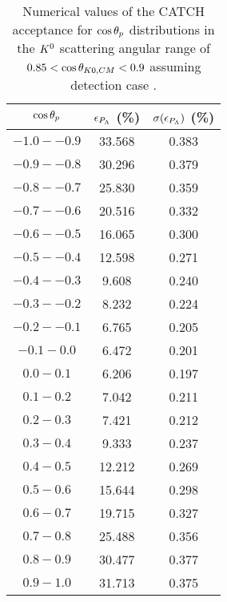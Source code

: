 \begin{table}[!h] 
  \begin{center}
  \caption{Numerical values of the CATCH acceptance for $\cos{\theta_p}$ distributions in the $K^{0}$ scattering angular range of \textbf{$0.85<\cos{\theta_{K0,CM}}<0.9$} assuming detection case .}
  \centering
  \begin{threeparttable}
    \begin{tabular}{ccc}
    $\cos{\theta_p}$ & $\epsilon_{P_{\Lambda}}$ (\%) & $\sigma(\epsilon_{P_{\Lambda}})$ (\%) \\
    \midrule\midrule
    $-1.0 - -0.9$ & 33.568 & 0.383 \\
    \midrule
    $-0.9 - -0.8$ & 30.296 & 0.379 \\
    \midrule
    $-0.8 - -0.7$ & 25.830 & 0.359 \\
    \midrule
    $-0.7 - -0.6$ & 20.516 & 0.332 \\
    \midrule
    $-0.6 - -0.5$ & 16.065 & 0.300 \\
    \midrule
    $-0.5 - -0.4$ & 12.598 & 0.271 \\
    \midrule
    $-0.4 - -0.3$ & 9.608 & 0.240 \\
    \midrule
    $-0.3 - -0.2$ & 8.232 & 0.224 \\
    \midrule
    $-0.2 - -0.1$ & 6.765 & 0.205 \\
    \midrule
    $-0.1 - 0.0$ & 6.472 & 0.201 \\
    \midrule
    $0.0 - 0.1$ & 6.206 & 0.197 \\
    \midrule
    $0.1 - 0.2$ & 7.042 & 0.211 \\
    \midrule
    $0.2 - 0.3$ & 7.421 & 0.212 \\
    \midrule
    $0.3 - 0.4$ & 9.333 & 0.237 \\
    \midrule
    $0.4 - 0.5$ & 12.212 & 0.269 \\
    \midrule
    $0.5 - 0.6$ & 15.644 & 0.298 \\
    \midrule
    $0.6 - 0.7$ & 19.715 & 0.327 \\
    \midrule
    $0.7 - 0.8$ & 25.488 & 0.356 \\
    \midrule
    $0.8 - 0.9$ & 30.477 & 0.377 \\
    \midrule
    $0.9 - 1.0$ & 31.713 & 0.375 \\
    \end{tabular}
  \end{threeparttable}
  \label{tab-Pl-acc_37}
  \end{center}
\end{table}

